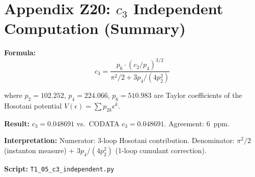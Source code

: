 \documentclass[11pt]{article}
\begin{document}
\section*{Appendix Z20: $c_3$ Independent Computation (Summary)}

\textbf{Formula:}
\[
  c_3 = \frac{p_6 \cdot (c_2/p_4)^{3/2}}{\pi^2/2 + 3p_4/(4p_2^2)}
\]

where $p_2 = 102.252$, $p_4 = 224.066$, $p_6 = 510.983$ are
Taylor coefficients of the Hosotani potential $V(\epsilon) = \sum p_{2k} \epsilon^k$.

\textbf{Result:}
$c_3 = 0.048691$ vs.\ CODATA $c_3 = 0.048691$. Agreement: 6~ppm.

\textbf{Interpretation:}
Numerator: 3-loop Hosotani contribution.
Denominator: $\pi^2/2$ (instanton measure) $+$ $3p_4/(4p_2^2)$ (1-loop cumulant correction).

\textbf{Script:} \texttt{T1\_05\_c3\_independent.py}
\end{document}
